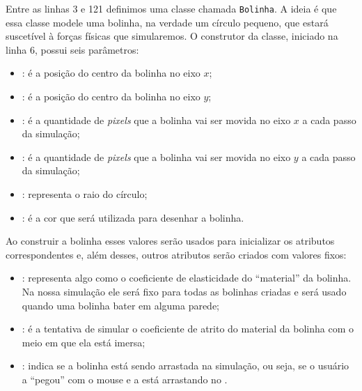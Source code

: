 Entre as linhas 3 e 121 definimos uma classe chamada \texttt{Bolinha}. A ideia é que essa classe modele uma bolinha, na verdade um círculo pequeno, que estará suscetível à forças físicas que simularemos. O construtor da classe, iniciado na linha 6, possui seis parâmetros:

\begin{itemize}
    \item {}: é a posição do centro da bolinha no eixo $x$;
    \item {}: é a posição do centro da bolinha no eixo $y$;
    \item {}: é a quantidade de \textit{pixels} que a bolinha vai ser movida no eixo $x$ a cada passo da simulação;
    \item {}: é a quantidade de \textit{pixels} que a bolinha vai ser movida no eixo $y$ a cada passo da simulação;
    \item {}: representa o raio do círculo;
    \item {}: é a cor que será utilizada para desenhar a bolinha.
\end{itemize}

Ao construir a bolinha esses valores serão usados para inicializar os atributos correspondentes e, além desses, outros atributos serão criados com valores fixos:

\begin{itemize}
    \item {}: representa algo como o coeficiente de elasticidade do ``material'' da bolinha. Na nossa simulação ele será fixo para todas as bolinhas criadas e será usado quando uma bolinha bater em alguma parede;
    \item {}: é a tentativa de simular o coeficiente de atrito do material da bolinha com o meio em que ela está imersa;
    \item {}: indica se a bolinha está sendo arrastada na simulação, ou seja, se o usuário a ``pegou'' com o mouse e a está arrastando no .
\end{itemize}

